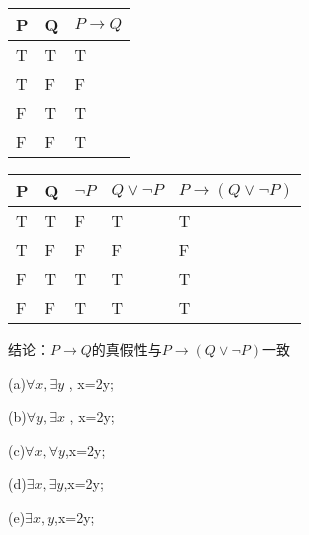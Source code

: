 \documentclass[a4paper, justified]{tufte-handout}
\begin{document}
\begin{solution}

  \begin{table}[h!]
    \begin{tabular}{|l|l|l|}
      \hline
      P & Q & $ P \to Q$ \\ \hline
      T & T & T          \\ \hline
      T & F & F          \\ \hline
      F & T & T          \\ \hline
      F & F & T          \\ \hline
    \end{tabular}
  \end{table}

  \begin{table}[h!]
    \begin{tabular}{|l|l|l|l|l|}
      \hline
      P & Q & $\neg P$ & $Q \vee \neg P$ & $P \to (Q \vee \neg P)$ \\ \hline
      T & T & F        & T               & T                       \\ \hline
      T & F & F        & F               & F                       \\ \hline
      F & T & T        & T               & T                       \\ \hline
      F & F & T        & T               & T                       \\ \hline
    \end{tabular}
  \end{table}

  结论：$P \to Q$的真假性与$P \to (Q \vee \neg P)$一致
\end{solution}

\begin{problem}
\end{problem}

\begin{solution}

  (a)$\forall x ,\exists y$ , x=2y;

  (b)$\forall y ,\exists x$ , x=2y;

  (c)$\forall x,\forall y$,x=2y;

  (d)$\exists x, \exists y$,x=2y;

  (e)$\exists x,y$,x=2y;
\end{solution}
\end{document}
